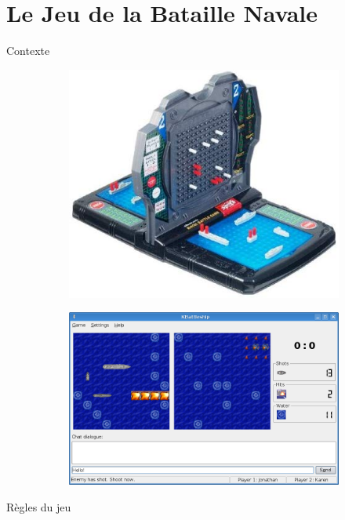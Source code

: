 \section{Le Jeu de la Bataille Navale}
	
	\begin{frame}{Contexte}
		\begin{figure}
		  \begin{subfigure}{.45\textwidth}
		  \centering
          \includegraphics[width=.9\linewidth]{images/plateau.jpg}
          \label{fig:pbn}
        \end{subfigure}
        \begin{subfigure}{.53\textwidth}
          \centering
          \includegraphics[width=.9\linewidth]{images/kbattleship.png}
          \label{fig:kbn}
        \end{subfigure}
        \end{figure}
	\end{frame}
	
	\begin{frame}{Règles du jeu}
	    
	\end{frame}{}